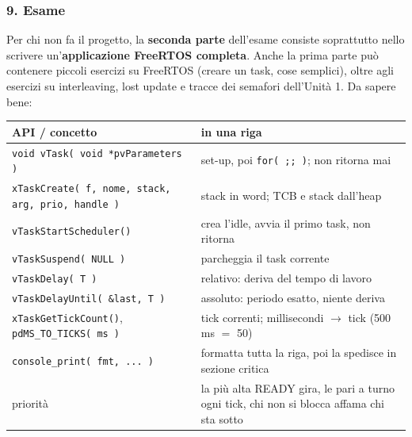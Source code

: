 \subsubsection*{9. Esame}
Per chi non fa il progetto, la \textbf{seconda parte} dell'esame consiste soprattutto nello scrivere un'\textbf{applicazione FreeRTOS completa}. Anche la prima parte può contenere piccoli esercizi su FreeRTOS (creare un task, cose semplici), oltre agli esercizi su interleaving, lost update e tracce dei semafori dell'Unità 1. Da sapere bene:
\begin{center}
\small
\begin{tabular}{P{0.38} P{0.52}}
    \hline
    \textbf{API / concetto} & \textbf{in una riga} \\
    \hline
    \texttt{void vTask( void *pvParameters )} & set-up, poi \texttt{for( ;; )}; non ritorna mai \\
    \texttt{xTaskCreate( f, nome, stack, arg, prio, handle )} & stack in word; TCB e stack dall'heap \\
    \texttt{vTaskStartScheduler()} & crea l'idle, avvia il primo task, non ritorna \\
    \texttt{vTaskSuspend( NULL )} & parcheggia il task corrente \\
    \texttt{vTaskDelay( T )} & relativo: deriva del tempo di lavoro \\
    \texttt{vTaskDelayUntil( \&last, T )} & assoluto: periodo esatto, niente deriva \\
    \texttt{xTaskGetTickCount()}, \texttt{pdMS\_TO\_TICKS( ms )} & tick correnti; millisecondi $\to$ tick (500\,ms $=$ 50) \\
    \texttt{console\_print( fmt, ... )} & formatta tutta la riga, poi la spedisce in sezione critica \\
    priorità & la più alta READY gira, le pari a turno ogni tick, chi non si blocca affama chi sta sotto \\
    \hline
\end{tabular}
\end{center}

